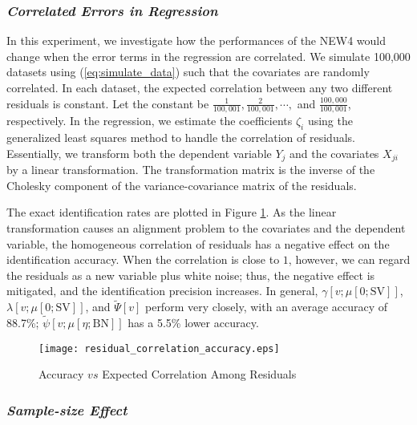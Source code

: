 \documentclass[a4paper,12pt]{article}
\begin{document}
\subsubsection{\textit{Correlated Errors in Regression}}
\noindent
In this experiment, we investigate how the performances of the NEW4 would change when the error terms in the regression are correlated.
We simulate 100,000 datasets using (\ref{eq:simulate_data}) such that the covariates are randomly correlated.
In each dataset, the expected correlation between any two different residuals is constant. Let the constant be
$\frac{1}{100,001}, \frac{2}{100,001},\cdots,$ and $\frac{100,000}{100,001}$, respectively.
In the regression, we estimate the coefficients $\zeta_i$ using the generalized least squares method to handle the correlation of residuals.
Essentially, we transform both the dependent variable $Y_j$ and the covariates $X_{ji}$ by a linear transformation. 
The transformation matrix is the inverse of the Cholesky component of the variance-covariance matrix of the residuals.

The exact identification rates are plotted in Figure \ref{fig:correlated_residuals}. 
As the linear transformation causes an alignment problem to the covariates and the dependent variable, the homogeneous correlation of residuals has a negative effect on the identification accuracy.
When the correlation is close to $1$, however, we can regard the residuals as a new variable plus white noise; thus, the negative effect is mitigated, and the identification precision increases.
In general, $\gamma [v;\mu[0; \mathrm{SV}]]$, $\lambda [v;\mu[0; \mathrm{SV}]]$, and $\tilde \Psi [v]$ perform very closely, with an average accuracy of 88.7\%;
$\tilde\psi [v;\mu[\eta; \mathrm{BN}]]$ has a 5.5\% lower accuracy.

\begin{figure}[!t]
	\centering
	\texttt{[image: residual\_correlation\_accuracy.eps]}
	\caption{Accuracy $vs$ Expected Correlation Among Residuals}\label{fig:correlated_residuals}
\end{figure}


\subsubsection{\textit{Sample-size Effect}}
\end{document}
